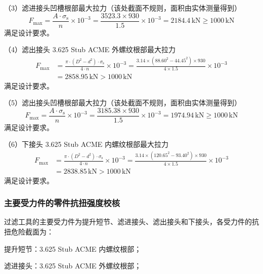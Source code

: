 （3）滤进接头凹槽根部最大拉力（该处截面不规则，面积由实体测量得到）
\begin{equation}
F_{\max} = \frac{A \cdot \sigma_{\mathrm{s}}}{n} \times 10^{-3} = \frac{3523.3 \times 930}{1.5} \times 10^{-3} = 2184.4\,\text{kN} \geq 1000\,\text{kN}
\end{equation}
满足设计要求。

（4）滤出接头 3.625 Stub ACME 外螺纹根部最大拉力
\begin{equation}
    \begin{aligned}
        F_{\max} &= \frac{\pi \cdot (D^2 - d^2) \cdot \sigma_\mathrm{s}}{4 \cdot n} \times 10^{-3} 
                = \frac{3.14 \times (88.60^2 - 44.45^2) \times 930}{4 \times 1.5} \times 10^{-3} \\
                &= 2858.95\,\text{kN} > 1000\,\text{kN}
    \end{aligned}
\end{equation}
满足设计要求。

（5）滤出接头凹槽根部最大拉力（该处截面不规则，面积由实体测量得到）
\begin{equation}
F_{\max} = \frac{A \cdot \sigma_{\mathrm{s}}}{n} \times 10^{-3} = \frac{3185.38 \times 930}{1.5} \times 10^{-3} = 1974.94\,\text{kN} \geq 1000\,\text{kN}
\end{equation}
满足设计要求。

（6）下接头 3.625 Stub ACME 内螺纹根部最大拉力
\begin{equation}
    \begin{aligned}
        F_{\max} &= \frac{\pi \cdot (D^2 - d^2) \cdot \sigma_{\mathrm{s}}}{4 \cdot n} \times 10^{-3}
                 = \frac{3.14 \times (120.65^2 - 93.40^2) \times 930}{4 \times 1.5} \times 10^{-3} \\
                 &= 2838.85\,\text{kN} > 1000\,\text{kN}
    \end{aligned}
\end{equation}
满足设计要求。


\subsubsection{主要受力件的零件抗扭强度校核}

过滤工具的主要受力件为提升短节、滤进接头、滤出接头和下接头，各受力件的抗扭危险截面为：

提升短节：3.625 Stub ACME 内螺纹根部；

滤进接头：3.625 Stub ACME 外螺纹根部；

